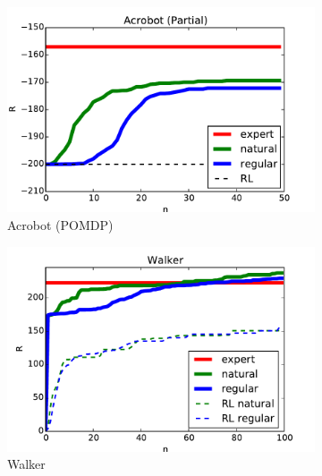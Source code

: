 \documentclass{article}
\begin{document}
\begin{figure}[t!]
    \begin{subfigure}[l]{0.1962\textwidth}
        \includegraphics[width=1.12\textwidth,keepaspectratio]{./figure/Acrobot_LSTM_comparison.pdf}
        \caption{Acrobot (POMDP)}
        \label{fig:acrobot_partial}
    \end{subfigure}
    \begin{subfigure}[l]{0.1962\textwidth}
        \includegraphics[width=1.12\textwidth,keepaspectratio]{./figure/Walker_comparison.pdf}
        \caption{Walker}
        \label{fig:walker}
    \end{subfigure}
	\begin{subfigure}[l]{0.1962\textwidth}

\end{subfigure}
\end{figure}
\end{document}
